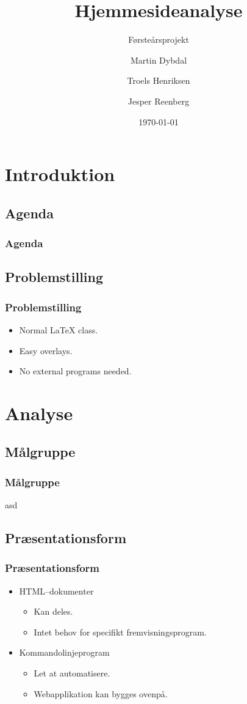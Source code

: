 \documentclass{beamer}
\title{Hjemmesideanalyse}
\subtitle{Førsteårsprojekt}
\author{Martin Dybdal \and Troels Henriksen \and Jesper Reenberg}
\institute{\textrm{Datalogisk Institut, Københavns Universitet}}
\date{\today}
\begin{document}
\frame{\titlepage}


\section{Introduktion}
\subsection{Agenda}
\begin{frame}
  \frametitle{Agenda}
  \tableofcontents
\end{frame}

\subsection{Problemstilling}
\begin{frame}
  \frametitle{Problemstilling}

  \begin{itemize}
  \item<1-> Normal LaTeX class.
  \item<2-> Easy overlays.
  \item<3-> No external programs needed.      
  \end{itemize}
\end{frame}

\section{Analyse} %
\subsection{Målgruppe}
\begin{frame}
  \frametitle{Målgruppe}
asd

\end{frame}

\subsection{Præsentationsform}
\begin{frame}
  \frametitle{Præsentationsform}
  \begin{itemize}
    \item<1->HTML--dokumenter
      \begin{itemize}
      \item<2-> Kan deles.
      \item<2-> Intet behov for specifikt fremvisningsprogram.
      \end{itemize}  

    \item<3->Kommandolinjeprogram
      \begin{itemize}
      \item<4-> Let at automatisere.
      \item<4-> Webapplikation kan bygges ovenpå.
      \end{itemize}  
    \end{itemize}
\end{frame}
\end{document}
